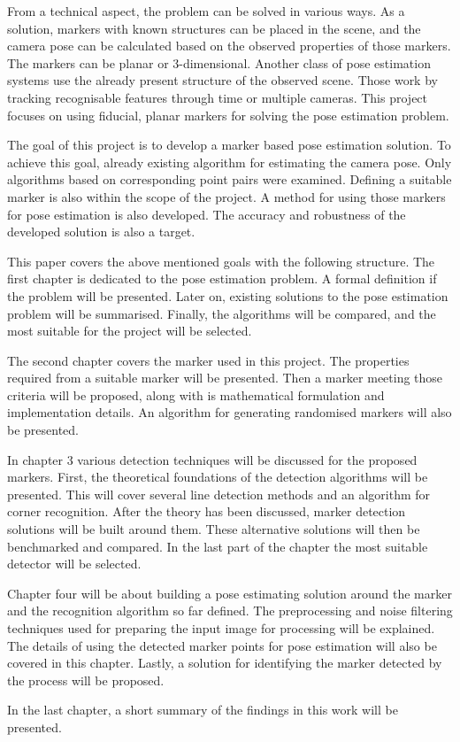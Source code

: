 From a technical aspect, the problem can be solved in various ways.
As a solution, markers with known structures can be placed in the scene, and the camera pose can be calculated based on the observed properties of those markers.
The markers can be planar or 3-dimensional.
Another class of pose estimation systems use the already present structure of the observed scene.
Those work by tracking recognisable features through time or multiple cameras.
This project focuses on using fiducial, planar markers for solving the pose estimation problem.

The goal of this project is to develop a marker based pose estimation solution.
To achieve this goal, already existing algorithm for estimating the camera pose.
Only algorithms based on corresponding point pairs were examined.
Defining a suitable marker is also within the scope of the project.
A method for using those markers for pose estimation is also developed.
The accuracy and robustness of the developed solution is also a target.

This paper covers the above mentioned goals with the following structure.
The first chapter is dedicated to the pose estimation problem.
A formal definition if the problem will be presented.
Later on, existing solutions to the pose estimation problem will be summarised.
Finally, the algorithms will be compared, and the most suitable for the project will be selected.

The second chapter covers the marker used in this project.
The properties required from a suitable marker will be presented.
Then a marker meeting those criteria will be proposed, along with is mathematical formulation and implementation details.
An algorithm for generating randomised markers will also be presented. 

In chapter 3 various detection techniques will be discussed for the proposed markers.
First, the theoretical foundations of the detection algorithms will be presented.
This will cover several line detection methods and an algorithm for corner recognition.
After the theory has been discussed, marker detection solutions will be built around them.
These alternative solutions will then be benchmarked and compared.
In the last part of the chapter the most suitable detector will be selected.

Chapter four will be about building a pose estimating solution around the marker and the recognition algorithm so far defined.
The preprocessing and noise filtering techniques used for preparing the input image for processing will be explained.
The details of using the detected marker points for pose estimation will also be covered in this chapter.
Lastly, a solution for identifying the marker detected by the process will be proposed.

In the last chapter, a short summary of the findings in this work will be presented.
